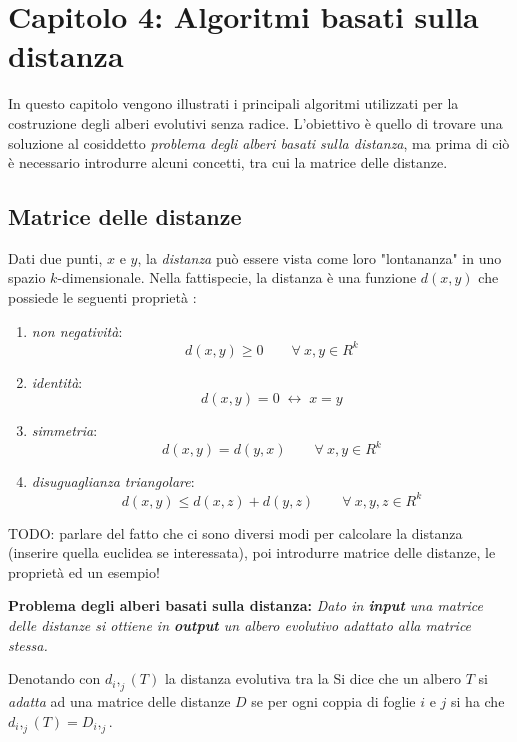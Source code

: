 \chapter{Capitolo 4: Algoritmi basati sulla distanza}
In questo capitolo vengono illustrati i principali algoritmi utilizzati per la costruzione degli alberi evolutivi senza radice. L'obiettivo è quello di trovare una soluzione al cosiddetto \textit{problema degli alberi basati sulla distanza}, ma prima di ciò è necessario introdurre alcuni concetti, tra cui la matrice delle distanze.

\section{Matrice delle distanze}
Dati due punti, $x$ e $y$, la \textit{distanza} può essere vista come loro "lontananza" in uno spazio $k$-dimensionale. Nella fattispecie, la distanza è una funzione $d(x,y)$ che possiede le seguenti proprietà \cite{molaCagliari}:
\begin{enumerate}
	\item \textit{non negatività}:
	\[d(x,y)\geq 0\hspace{2em} \forall \: x,y\in R^k\]
	\item \textit{identità}:
	\[d(x,y)=0 \; \leftrightarrow \; x=y\]
	\item \textit{simmetria}:
	\[d(x,y)=d(y,x)\hspace{2em} \forall \: x,y\in R^k\]
	\item \textit{disuguaglianza triangolare}:
	\[d(x,y)\leq d(x,z)+d(y,z)\hspace{2em} \forall \: x,y,z\in R^k\]
\end{enumerate}
TODO: parlare del fatto che ci sono diversi modi per calcolare la distanza (inserire quella euclidea se interessata), poi introdurre matrice delle distanze, le proprietà ed un esempio!
\newpage

\begin{center}
\textbf{Problema degli alberi basati sulla distanza:}
\newline
\textit{Dato in \textbf{input} una matrice delle distanze si ottiene in \textbf{output} un albero evolutivo adattato alla matrice stessa.}
\end{center}
Denotando con $d_i,_j(T)$ la distanza evolutiva tra la 
Si dice che un albero $T$ si \textit{adatta} ad una matrice delle distanze $D$ se per ogni coppia di foglie $i$ e $j$ si ha che $d_i,_j(T)=D_i,_j$.